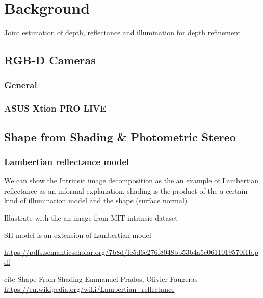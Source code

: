 \chapter{Background} \label{chap:background}
Joint estimation of depth, reflectance and illumination for depth refinement

\section{RGB-D Cameras}

\subsection{General}

\subsection{ASUS Xtion PRO LIVE}


\section{Shape from Shading \& Photometric Stereo}
\subsection{Lambertian reflectance model}
We can show the Intrinsic image decomposition as the an example of Lambertian reflectance as an informal explanation. shading is the product of the a certain kind of illumination model and the shape (surface normal)~\cite{barron2015shape}

Illustrate with the an image from MIT intrinsic dataset~\cite{grosse2009ground}

SH model is an extension of Lambertian model

  \url{https://pdfs.semanticscholar.org/7b8d/fc5d6e276f8048bb53b4a5e0611019570f1b.pdf}
\cite{basri2003lambertian}

cite Shape From Shading Emmanuel Prados, Olivier Faugeras
\url{https://en.wikipedia.org/wiki/Lambertian_reflectance}

